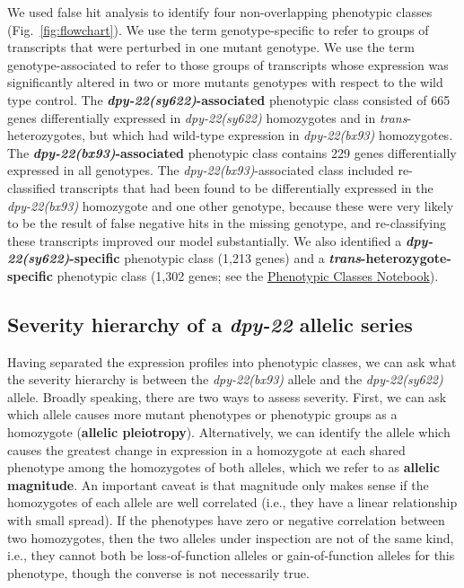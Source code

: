 \documentclass[9pt,twocolumn,twoside]{gsajnl}
\newcommand{\gene}[1]{\mbox{\emph{#1}}}
\newcommand{\dpy}[1]{\gene{dpy-22#1}}
\newcommand{\bx}{\dpy{(bx93)}}
\newcommand{\sy}{\dpy{(sy622)}}
\begin{document}
We used false hit analysis to identify four non-overlapping phenotypic classes
(Fig.~\ref{fig:flowchart}). We use the term genotype-specific to refer to groups
of transcripts that were perturbed in one mutant genotype. We use the term
genotype-associated to refer to those groups of transcripts whose expression was
significantly altered in two or more mutants genotypes with respect to the wild
type control. The \textbf{\sy{}-associated} phenotypic class consisted of 665
genes differentially expressed in \sy{} homozygotes and in
\emph{trans}-heterozygotes, but which had wild-type expression in \bx{}
homozygotes. The \textbf{\bx{}-associated} phenotypic class contains 229 genes
differentially expressed in all genotypes. The \bx{}-associated class included
re-classified transcripts that had been found to be differentially expressed in
the \bx{} homozygote and one other genotype, because these were very likely to
be the result of false negative hits in the missing genotype, and re-classifying
these transcripts improved our model substantially. We also identified a
\textbf{\sy{}-specific} phenotypic class (1,213 genes) and a
\textbf{\emph{trans}-heterozygote-specific} phenotypic class (1,302 genes; see
the
\href{https://wormlabcaltech.github.io/med-cafe/notebook/phenotypic_classes.html}{
Phenotypic Classes Notebook}).

\subsection*{Severity hierarchy of a \gene{dpy-22} allelic series}
Having separated the expression profiles into phenotypic classes, we can ask
what the severity hierarchy is between the \bx{} allele and the \sy{} allele.
Broadly speaking, there are two ways to assess severity. First, we can ask which
allele causes more mutant phenotypes or phenotypic groups as a homozygote
(\textbf{allelic pleiotropy}). Alternatively, we can identify the allele which
causes the greatest change in expression in a homozygote at each shared
phenotype among the homozygotes of both alleles, which we refer to as
\textbf{allelic magnitude}. An important caveat is that magnitude only makes
sense if the homozygotes of each allele are well correlated (i.e., they have a
linear relationship with small spread). If the phenotypes have zero or negative
correlation between two homozygotes, then the two alleles under inspection are
not of the same kind, i.e., they cannot both be loss-of-function alleles or
gain-of-function alleles for this phenotype, though the converse is not
necessarily true.
\end{document}
